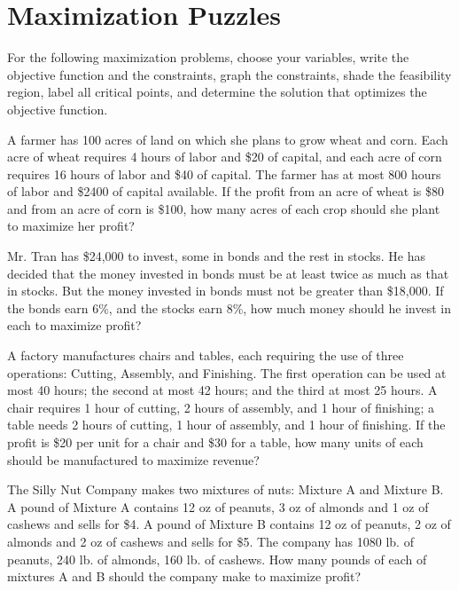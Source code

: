 \section{Maximization Puzzles}

For the following maximization problems, choose your variables, write the objective function and the constraints, graph the constraints, shade the feasibility region, label all critical points, and determine the solution that optimizes the objective function.

\begin{puzzle}
    A farmer has 100 acres of land on which she plans to grow wheat and corn. Each acre of wheat
    requires 4 hours of labor and \$20 of capital, and each acre of corn requires 16 hours of labor and
    \$40 of capital. The farmer has at most 800 hours of labor and \$2400 of capital available. If the
    profit from an acre of wheat is \$80 and from an acre of corn is \$100, how many acres of each crop
    should she plant to maximize her profit?
\end{puzzle}

\begin{puzzle}
    Mr. Tran has \$24,000 to invest, some in bonds and the rest in stocks. He has decided that the
    money invested in bonds must be at least twice as much as that in stocks. But the money invested
    in bonds must not be greater than \$18,000. If the bonds earn 6\%, and the stocks earn 8\%, how
    much money should he invest in each to maximize profit?
\end{puzzle}

\begin{puzzle}
    A factory manufactures chairs and tables, each requiring the use of three operations: Cutting,
    Assembly, and Finishing. The first operation can be used at most 40 hours; the second at most 42
    hours; and the third at most 25 hours. A chair requires 1 hour of cutting, 2 hours of assembly, and
    1 hour of finishing; a table needs 2 hours of cutting, 1 hour of assembly, and 1 hour of finishing.
    If the profit is \$20 per unit for a chair and \$30 for a table, how many units of each should be
    manufactured to maximize revenue?

\end{puzzle}

\begin{puzzle}
    The Silly Nut Company makes two mixtures of nuts: Mixture A and Mixture B. A pound of
    Mixture A contains 12 oz of peanuts, 3 oz of almonds and 1 oz of cashews and sells for \$4. A pound
    of Mixture B contains 12 oz of peanuts, 2 oz of almonds and 2 oz of cashews and sells for \$5. The
    company has 1080 lb. of peanuts, 240 lb. of almonds, 160 lb. of cashews. How many pounds of
    each of mixtures A and B should the company make to maximize profit?
\end{puzzle}